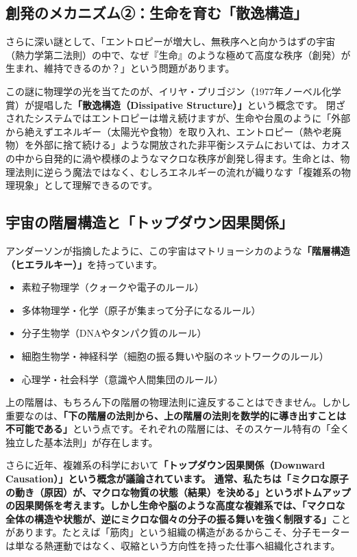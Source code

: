 \subsection{創発のメカニズム②：生命を育む「散逸構造」}

さらに深い謎として、「エントロピーが増大し、無秩序へと向かうはずの宇宙（熱力学第二法則）の中で、なぜ『生命』のような極めて高度な秩序（創発）が生まれ、維持できるのか？」という問題があります。

この謎に物理学の光を当てたのが、イリヤ・プリゴジン（1977年ノーベル化学賞）が提唱した\textbf{「散逸構造（Dissipative Structure）」}という概念です。 閉ざされたシステムではエントロピーは増え続けますが、生命や台風のように「外部から絶えずエネルギー（太陽光や食物）を取り入れ、エントロピー（熱や老廃物）を外部に捨て続ける」ような開放された非平衡システムにおいては、カオスの中から自発的に渦や模様のようなマクロな秩序が創発し得ます。生命とは、物理法則に逆らう魔法ではなく、むしろエネルギーの流れが織りなす「複雑系の物理現象」として理解できるのです。

\subsection{宇宙の階層構造と「トップダウン因果関係」}

アンダーソンが指摘したように、この宇宙はマトリョーシカのような\textbf{「階層構造（ヒエラルキー）」}を持っています。

\begin{itemize}
\item 素粒子物理学（クォークや電子のルール）
\item 多体物理学・化学（原子が集まって分子になるルール）
\item 分子生物学（DNAやタンパク質のルール）
\item 細胞生物学・神経科学（細胞の振る舞いや脳のネットワークのルール）
\item 心理学・社会科学（意識や人間集団のルール）
\end{itemize}

上の階層は、もちろん下の階層の物理法則に違反することはできません。しかし重要なのは、\textbf{「下の階層の法則から、上の階層の法則を数学的に導き出すことは不可能である」}という点です。それぞれの階層には、そのスケール特有の「全く独立した基本法則」が存在します。

さらに近年、複雑系の科学において\textbf{「トップダウン因果関係（Downward Causation）」という概念が議論されています。 通常、私たちは「ミクロな原子の動き（原因）が、マクロな物質の状態（結果）を決める」というボトムアップの因果関係を考えます。しかし生命や脳のような高度な複雑系では、「マクロな全体の構造や状態が、逆にミクロな個々の分子の振る舞いを強く制限する」}ことがあります。たとえば「筋肉」という組織の構造があるからこそ、分子モーターは単なる熱運動ではなく、収縮という方向性を持った仕事へ組織化されます。

